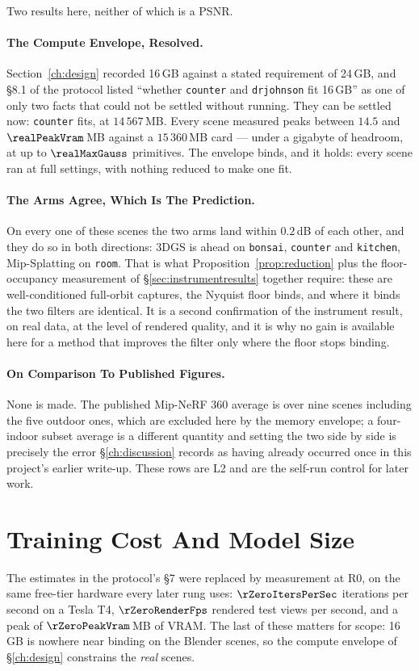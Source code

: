 

Two results here, neither of which is a PSNR.

\paragraph{The Compute Envelope, Resolved.} Section~\ref{ch:design} recorded 16\,GB
against a stated requirement of 24\,GB, and \S8.1 of the protocol listed
``whether \texttt{counter} and \texttt{drjohnson} fit 16\,GB'' as one of only two
facts that could not be settled without running. They can be settled now:
\texttt{counter} fits, at $14\,567$\,MB. Every scene measured peaks between
$14.5$ and $\realPeakVram$\,MB against a $15\,360$\,MB card --- under a gigabyte
of headroom, at up to $\realMaxGauss$ primitives. The envelope binds, and it holds: every scene ran at full settings, with nothing
reduced to make one fit.

\paragraph{The Arms Agree, Which Is The Prediction.} On every one of these
scenes the two arms land within $0.2$\,dB of each other, and they do so in both
directions: 3DGS is ahead on \texttt{bonsai}, \texttt{counter} and
\texttt{kitchen}, Mip-Splatting on \texttt{room}. That is what Proposition~\ref{prop:reduction}
plus the floor-occupancy measurement of \S\ref{sec:instrumentresults} together require: these
are well-conditioned full-orbit captures, the Nyquist floor binds, and where it
binds the two filters are identical. It is a second confirmation of the instrument result, on real data, at the level
of rendered quality, and it is why no gain is available here for a method that
improves the filter only where the floor stops binding.

\paragraph{On Comparison To Published Figures.} None is made. The published
Mip-NeRF 360 average is over nine scenes including the five outdoor ones, which
are excluded here by the memory envelope; a four-indoor subset average is a
different quantity and setting the two side by side is precisely the error
\S\ref{ch:discussion} records as having already occurred once in this project's
earlier write-up. These rows are L2 and are the self-run control for later work.

\section{Training Cost And Model Size}
\label{sec:measuredcost}
The estimates in the protocol's \S7 were replaced by measurement at R0, on the
same free-tier hardware every later rung uses: $\rZeroItersPerSec$ iterations per
second on a Tesla T4, $\rZeroRenderFps$ rendered test views per second, and a
peak of $\rZeroPeakVram$\,MB of VRAM. The last of these matters for scope: 16\,GB
is nowhere near binding on the Blender scenes, so the compute envelope of
\S\ref{ch:design} constrains the \emph{real} scenes.

